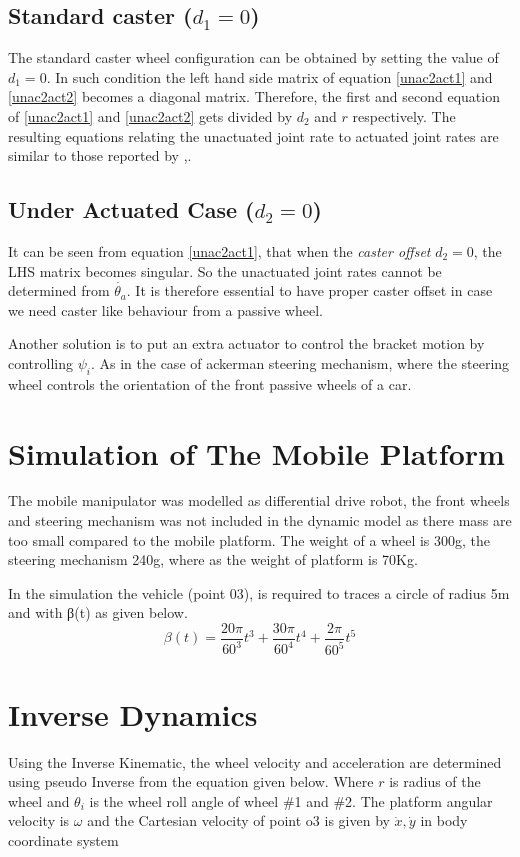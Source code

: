 \subsection{Standard caster ($d_1=0$) }
The  standard caster wheel configuration can be obtained by setting the value of $d_1=0$. In such condition the left hand side matrix of  equation \ref{unac2act1} and \ref{unac2act2} becomes  a diagonal matrix. Therefore, the first and second equation of \ref{unac2act1} and \ref{unac2act2} gets divided by $d_2$ and $r$ respectively. The resulting  equations relating the unactuated joint rate to  actuated joint rates are similar to those reported by \cite{saha1991dynamics},\cite{angeles2013fundamentals}.
\subsection{Under Actuated Case ($d_2=0$)}
It can be seen from equation \ref{unac2act1}, that when the \textit{caster offset} $d_2=0$, the LHS matrix becomes singular. So the unactuated joint rates cannot be determined from $\dot{\theta_a}$. It is therefore essential to have proper caster offset in case we need caster like behaviour from a passive wheel. 

Another solution is to put an extra actuator to control the bracket motion by controlling $\psi_i$. As in the case of ackerman steering mechanism, where the steering wheel controls the orientation of the front passive wheels of a car.

\section{Simulation of The Mobile Platform }
 
The mobile manipulator was modelled as differential drive robot, the front wheels and steering mechanism was not included in the dynamic model as there mass are too small compared to the mobile platform. The weight of a wheel is 300g, the steering mechanism 240g, where as the weight of platform is 70Kg.

In the simulation the vehicle (point 03), is required to traces a circle of radius 5m and with β(t) as given below.
\begin{equation}
\label{path}
\beta(t)=\frac{20\pi}{60^3}t^3+\frac{30\pi}{60^4}t^4+\frac{2\pi}{60^5}t^5
\end{equation}

\section{Inverse Dynamics}
Using the Inverse Kinematic,  the wheel velocity and acceleration are determined using pseudo Inverse   from the equation given below. Where $r$ is radius of the wheel and $\theta_i$ is the wheel roll angle of wheel \#1 and \#2. The platform angular velocity is $\omega$ and the Cartesian velocity of point o3 is given by $\dot{x},\dot{y}$ in body coordinate system
   
